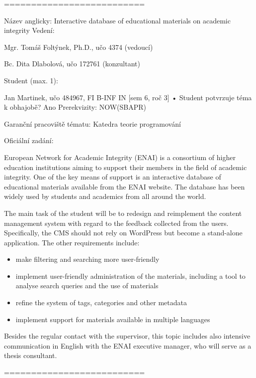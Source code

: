 \documentclass[
  digital,     %
  oneside,     %
  nosansbold,  %
  colorbold, %
  lof,         %
  lot,         %
]{fithesis4}
\begin{document}
==========================

Název anglicky: Interactive database of educational materials on academic integrity
Vedení:

Mgr. Tomáš Foltýnek, Ph.D., učo 4374 (vedoucí)   

Bc. Dita Dlabolová, učo 172761 (konzultant)   

Student (max. 1):

Jan Martinek, učo 484967, FI B-INF IN [sem 6, roč 3] • Student potvrzuje téma k obhajobě? Ano
Prerekvizity: NOW(SBAPR)

Garanční pracoviště tématu: Katedra teorie programování

Oficiální zadání:

European Network for Academic Integrity (ENAI) is a consortium of higher education institutions
aiming to support their members in the field of academic integrity. One of the key means of
support is an interactive database of educational materials available from the ENAI website.
The database has been widely used by students and academics from all around the world.

The main task of the student will be to redesign and reimplement the content management
system with regard to the feedback collected from the users. Specifically, the CMS should
not rely on WordPress but become a stand-alone application. The other requirements include:

\begin{itemize}
    \item make filtering and searching more user-friendly
    \item implement user-friendly administration of the materials, including a tool to
    analyse search queries and the use of materials
    \item refine the system of tags, categories and other metadata
    \item implement support for materials available in multiple languages
\end{itemize}

Besides the regular contact with the supervisor, this topic includes also intensive
communication in English with the ENAI executive manager, who will serve as a thesis
consultant.

==========================

\printbibliography[heading=bibintoc] %


\end{document}
